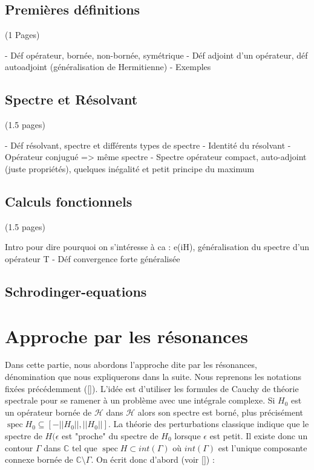 \documentclass[12pt,openany,a4paper, titlepage]{article}
\newcommand{\lc}{\left[}
\newcommand{\rcc}{\right]}
\newcommand{\C}{\mathbb{C}}
\newcommand{\spec}{\operatorname{spec}}
\theoremstyle{definition}
\theoremstyle{definition}
\theoremstyle{definition}
\theoremstyle{definition}
\theoremstyle{definition}
\begin{document}
\subsection{Premières définitions} (1 Pages)

- Déf opérateur, bornée, non-bornée, symétrique
- Déf adjoint d'un opérateur, déf autoadjoint (généralisation de Hermitienne)
- Exemples

\subsection{Spectre et Résolvant} (1.5 pages)

- Déf résolvant, spectre et différents types de spectre
- Identité du résolvant
- Opérateur conjugué => même spectre
- Spectre opérateur compact, auto-adjoint (juste propriétés), quelques inégalité et petit principe du maximum


\subsection{Calculs fonctionnels} (1.5 pages)

Intro pour dire pourquoi on s'intéresse à ca : e(iH), généralisation du spectre d'un opérateur T
- Déf convergence forte généralisée

\subsection{Schrodinger-equations}



\newpage
\section{Approche par les résonances}

Dans cette partie, nous abordons l'approche dite par les résonances, dénomination que nous expliquerons dans la suite. Nous reprenons les notations fixées précédemment ([]). L'idée est d'utiliser les formules de Cauchy de théorie spectrale pour se ramener à un problème avec une intégrale complexe. Si $H_0$ est un opérateur bornée de $\mathcal{H}$ dans $\mathcal{H}$ alors son spectre est borné, plus précisément $\spec H_0 \subseteq \lc-||H_0||, ||H_0||\rcc$. La théorie des perturbations classique indique que le spectre de $H(\epsilon$ est "proche" du spectre de $H_0$ lorsque $\epsilon$ est petit. Il existe donc un contour $\Gamma$ dans $\C$ tel que $\spec H \subset int(\Gamma)$ où $int(\Gamma)$ est l'unique composante connexe bornée  de $\C\setminus \Gamma$. On écrit donc d'abord (voir []) :
\end{document}
